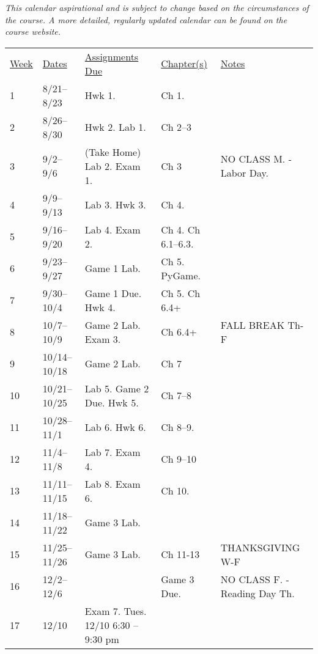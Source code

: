 \documentclass[10pt]{article}
\begin{document}
\textit{This calendar aspirational and is subject to change based on the circumstances of the course. A more detailed, regularly updated calendar can be found on the course website. }

\begin{center}
\begin{tabular}{lllll}
\underline{Week} & \underline{Dates} & \underline{Assignments Due} & \underline{Chapter(s)} & \underline{Notes} \\
1 & 8/21--8/23  & Hwk 1. & Ch 1. &  \\
2 & 8/26--8/30 &  Hwk 2. Lab 1. & Ch 2--3 & \\
3 & 9/2--9/6 & (Take Home) Lab 2. Exam 1. & Ch 3 & NO CLASS M. - Labor Day. \\
4 & 9/9--9/13  & Lab 3. Hwk 3.  &  Ch 4. &  \\
5 & 9/16--9/20 & Lab 4. Exam 2. & Ch 4. Ch 6.1--6.3.  & \\
6 & 9/23--9/27 & Game 1 Lab. & Ch 5. PyGame. & \\
7 & 9/30--10/4 & Game 1 Due. Hwk 4. & Ch 5. Ch 6.4+  & \\
8 & 10/7--10/9 & Game 2 Lab. Exam 3. & Ch 6.4+ & FALL BREAK Th-F  \\
9 & 10/14--10/18 & Game 2 Lab. & Ch 7 & \\
10 & 10/21--10/25  & Lab 5. Game 2 Due. Hwk 5. & Ch 7--8 & \\
11 & 10/28--11/1 & Lab 6. Hwk 6. & Ch 8--9. & \\
12 & 11/4--11/8 & Lab 7. Exam 4. & Ch 9--10  & \\
13 & 11/11--11/15 & Lab 8. Exam 6. &  Ch 10.  & \\
14 & 11/18--11/22 & Game 3 Lab. &  & \\
15 & 11/25--11/26 & Game 3 Lab. & Ch 11-13 & THANKSGIVING W-F \\
16 & 12/2--12/6 & & Game 3 Due. & NO CLASS F. - Reading Day Th.\\
17 & 12/10 & Exam 7. Tues. 12/10 6:30 -- 9:30 pm & &  \\
\end{tabular}
\end{center}
\end{document}

